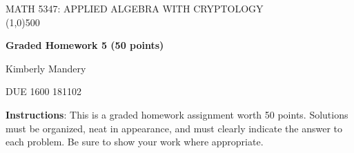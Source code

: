 \documentclass[12pt]{article}
\begin{document}
              

\begin{centering}
	
	MATH 5347: APPLIED ALGEBRA WITH CRYPTOLOGY\\

 \line(1,0){500}

\end{centering}

	\par\vspace{3mm}

\begin{centering}
	{\bf Graded Homework 5 (50 points)}
	\par\vspace{1mm}
    {Kimberly Mandery}
    \par\vspace{1mm}
	{DUE 1600 181102}


\end{centering}



\vspace{3mm}

{\bf Instructions}: This is a graded homework assignment worth 50 points.  Solutions must be organized, neat in appearance, and must clearly indicate the answer to each problem.  Be sure to show your work where appropriate.  

\vspace{5mm}
\end{document}
